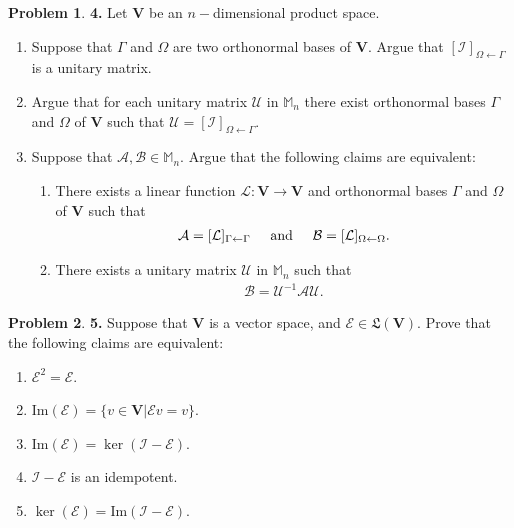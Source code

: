 \documentclass{book}
\theoremstyle{definition}
\newtheorem*{prob*}{Problem}
\newcommand{\Uni}{\mathcal{U}}
\newcommand{\V}{\mathbf{V}}
\newcommand{\A}{\mathcal{A}}
\newcommand{\B}{\mathcal{B}}
\newcommand{\lag}{\mathcal{L}}
\newcommand{\E}{\mathcal{E}}
\newcommand{\ima}{\text{Im}}
\newcommand{\LL}{\mathfrak{L}}
\newcommand{\id}{\mathcal{I}}
\begin{document}
\newpage



\begin{prob*}\textbf{4.} Let $\V$ be an $n-$dimensional product space.
	\begin{enumerate}
		\item Suppose that $\Gamma$ and $\Omega$ are two orthonormal bases of $\V$. Argue that $[\mathcal{I}]_{\Omega\leftarrow\Gamma}$ is a unitary matrix.
		
		\item Argue that for each unitary matrix $\Uni$ in $\mathbb{M}_n$ there exist orthonormal bases $\Gamma$ and $\Omega$ of $\V$ such that $\Uni = [\id]_{\Omega\leftarrow\Gamma}$. 
		
		
		\item Suppose that $\A, \B \in \mathbb{M}_n$. Argue that the following claims are equivalent:
		\begin{enumerate}
			\item There exists a linear function $\lag : \V \to \V$ and orthonormal bases $\Gamma$ and $\Omega$ of $\V$ such that 
			\begin{align*}
			\A = [\lag]_{\Gamma\leftarrow \Gamma} \hspace{0.5cm} \text{and} \hspace{0.5cm} \B = [\lag]_{\Omega \leftarrow\Omega}.
			\end{align*}
			
			\item There exists a unitary matrix $\Uni$ in $\mathbb{M}_n$ such that 
			\begin{align*}
			\B = \Uni^{-1}\A \Uni.
			\end{align*}
			
		\end{enumerate}
	\end{enumerate}
	
\end{prob*}







\newpage



\begin{prob*}\textbf{5.} Suppose that $\V$ is a vector space, and $\E \in \LL(\V)$. Prove that the following claims are equivalent:
	\begin{enumerate}
		\item $\E^2 = \E$.
		\item $\ima(\E)= \{ v \in \V \vert \E v = v \}$.
		\item $\ima(\E) = \ker(\id - \E)$.
		\item $\id - \E$ is an idempotent.
		\item $\ker(\E) = \ima(\id - \E)$.
	\end{enumerate}
\end{prob*}
\end{document}
